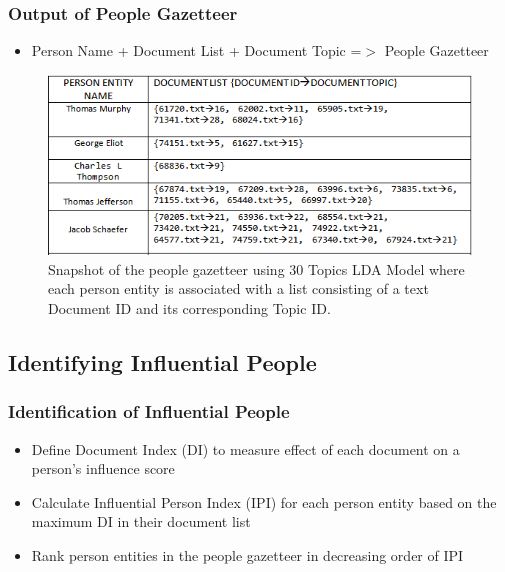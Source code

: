 \documentclass{beamer}
\begin{document}
\begin{frame}
\frametitle{Output of People Gazetteer}
\begin{itemize}
\item
Person Name + Document List + Document Topic =$>$ People Gazetteer
\end{itemize}
\begin{figure}[ht]
\begin{center}
\includegraphics[scale=0.7]{images/gaz2.png}
\caption{Snapshot of the people gazetteer using 30 Topics LDA Model where each person entity is associated with a list consisting of a text Document ID and its corresponding Topic ID.}
\end{center}
\end{figure}
\end{frame}

\subsection{Identifying Influential People}
\begin{frame}
\frametitle{Identification of Influential People}
\begin{itemize}
\item
Define Document Index (DI) to measure effect of each document on a person's influence score
\item
Calculate Influential Person Index (IPI) for each person entity based on the maximum DI in their document list
\item
Rank person entities in the people gazetteer in decreasing order of IPI
\end{itemize}
\end{frame}
\end{document}
